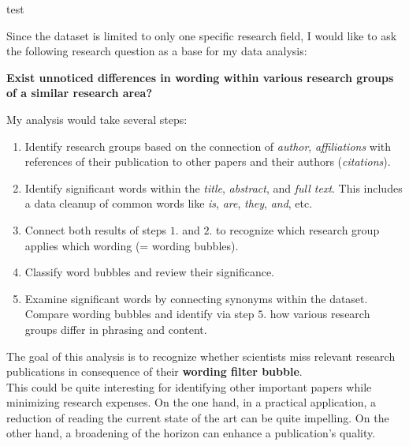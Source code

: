 \begin{homeworkProblem}
  test
\end{homeworkProblem}
\begin{homeworkProblem}
  Since the dataset is limited to only one specific research field, I would like to ask the following research question as a base for my data analysis:\\

\begin{center}\textbf{Exist unnoticed differences in wording within various research groups of a similar research area?}\\
\end{center}


  My analysis would take several steps:
  \begin{enumerate}
    \item Identify research groups based on the connection of \emph{author}, \emph{affiliations} with references of their publication to other papers and their authors (\emph{citations}).
    \item Identify significant words within the \emph{title}, \emph{abstract}, and \emph{full text}. This includes a data cleanup of common words like \textit{is}, \textit{are}, \textit{they}, \textit{and}, etc.
    \item Connect both results of steps $1.$ and $2.$ to recognize which research group applies which wording (= wording bubbles).
    \item Classify word bubbles and review their significance.
    \item Examine significant words by connecting synonyms within the dataset.
    Compare wording bubbles and identify via step $5.$ how various research groups differ in phrasing and content.
  \end{enumerate}


  The goal of this analysis is to recognize whether scientists miss relevant research publications in consequence of their \textbf{wording filter bubble}.\\

  This could be quite interesting for identifying other important papers while minimizing research expenses. On the one hand, in a practical application, a reduction of reading the current state of the art can be quite impelling. On the other hand, a broadening of the horizon can enhance a publication's quality.
\end{homeworkProblem}


